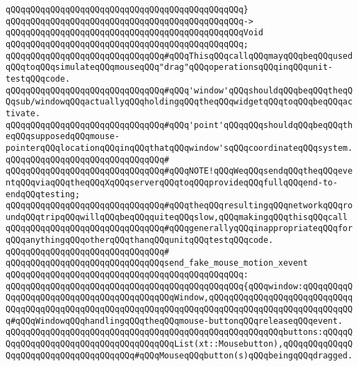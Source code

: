\verb|qQQqqQQqqQQqqQQqqQQqqQQqqQQqqQQqqQQqqQQqqQQqqQQq}|\newline
\verb|qQQqqQQqqQQqqQQqqQQqqQQqqQQqqQQqqQQqqQQqqQQqqQQq->|\newline
\verb|qQQqqQQqqQQqqQQqqQQqqQQqqQQqqQQqqQQqqQQqqQQqqQQqVoid|\newline
\verb|qQQqqQQqqQQqqQQqqQQqqQQqqQQqqQQqqQQqqQQqqQQqqQQq;|\newline
\newline
\verb|qQQqqQQqqQQqqQQqqQQqqQQqqQQqqQQq#qQQqThisqQQqcallqQQqmayqQQqbeqQQqusedqQQqtoqQQqsimulateqQQqmouseqQQq"drag"qQQqoperationsqQQqinqQQqunit-testqQQqcode.|\newline
\verb|qQQqqQQqqQQqqQQqqQQqqQQqqQQqqQQq#qQQq'window'qQQqshouldqQQqbeqQQqtheqQQqsub/windowqQQqactuallyqQQqholdingqQQqtheqQQqwidgetqQQqtoqQQqbeqQQqactivate.|\newline
\verb|qQQqqQQqqQQqqQQqqQQqqQQqqQQqqQQq#qQQq'point'qQQqqQQqshouldqQQqbeqQQqtheqQQqsupposedqQQqmouse-pointerqQQqlocationqQQqinqQQqthatqQQqwindow'sqQQqcoordinateqQQqsystem.|\newline
\verb|qQQqqQQqqQQqqQQqqQQqqQQqqQQqqQQq#|\newline
\verb|qQQqqQQqqQQqqQQqqQQqqQQqqQQqqQQq#qQQqNOTE!qQQqWeqQQqsendqQQqtheqQQqeventqQQqviaqQQqtheqQQqXqQQqserverqQQqtoqQQqprovideqQQqfullqQQqend-to-endqQQqtesting;|\newline
\verb|qQQqqQQqqQQqqQQqqQQqqQQqqQQqqQQq#qQQqtheqQQqresultingqQQqnetworkqQQqroundqQQqtripqQQqwillqQQqbeqQQqquiteqQQqslow,qQQqmakingqQQqthisqQQqcall|\newline
\verb|qQQqqQQqqQQqqQQqqQQqqQQqqQQqqQQq#qQQqgenerallyqQQqinappropriateqQQqforqQQqanythingqQQqotherqQQqthanqQQqunitqQQqtestqQQqcode.|\newline
\verb|qQQqqQQqqQQqqQQqqQQqqQQqqQQqqQQq#|\newline
\verb|qQQqqQQqqQQqqQQqqQQqqQQqqQQqqQQqsend_fake_mouse_motion_xevent|\newline
\verb|qQQqqQQqqQQqqQQqqQQqqQQqqQQqqQQqqQQqqQQqqQQqqQQq:|\newline
\verb|qQQqqQQqqQQqqQQqqQQqqQQqqQQqqQQqqQQqqQQqqQQqqQQq{qQQqwindow:qQQqqQQqqQQqqQQqqQQqqQQqqQQqqQQqqQQqqQQqqQQqWindow,qQQqqQQqqQQqqQQqqQQqqQQqqQQqqQQqqQQqqQQqqQQqqQQqqQQqqQQqqQQqqQQqqQQqqQQqqQQqqQQqqQQqqQQqqQQqqQQqqQQq#qQQqWindowqQQqhandlingqQQqtheqQQqmouse-buttonqQQqreleaseqQQqevent.|\newline
\verb|qQQqqQQqqQQqqQQqqQQqqQQqqQQqqQQqqQQqqQQqqQQqqQQqqQQqqQQqbuttons:qQQqqQQqqQQqqQQqqQQqqQQqqQQqqQQqqQQqqQQqList(xt::Mousebutton),qQQqqQQqqQQqqQQqqQQqqQQqqQQqqQQqqQQqqQQq#qQQqMouseqQQqbutton(s)qQQqbeingqQQqdragged.|\newline
